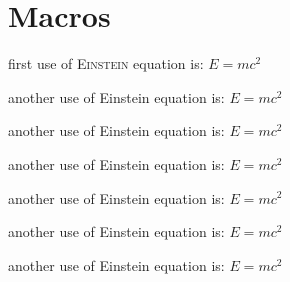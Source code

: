 \documentclass[12pt]{article}
\def\eq1{E=mc^2}
\begin{document}
\section{Macros}
first use of \textsc{Einstein} equation \cite{ref1} is: $\eq1$

another use of Einstein equation \cite{ref1} is: $\eq1$

\begin{large} another use of Einstein equation is: $\eq1$ \end{large}

\begin{Large} another use of Einstein equation is: $\eq1$ \end{Large}

\begin{Huge} another use of Einstein equation is: $\eq1$ \end{Huge}

\begin{small} another use of Einstein equation is: $\eq1$ \end{small}

\begin{tiny} another use of Einstein equation is: $\eq1$ \end{tiny}



%	
\end{document}
